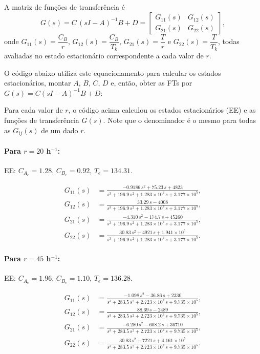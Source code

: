 \documentclass{article}
\begin{document}
A matriz de funções de transferência é
\[
G(s) = C\,(sI - A)^{-1} B + D =
\begin{bmatrix}
G_{11}(s) & G_{12}(s)\\
G_{21}(s) & G_{22}(s)
\end{bmatrix},
\]
onde $G_{11}(s) = \dfrac{C_B}{r}$, $G_{12}(s) = \dfrac{C_B}{T_k}$, $G_{21}(s) = \dfrac{T}{r}$ e $G_{22}(s) = \dfrac{T}{T_k}$, todas avaliadas no estado estacionário correspondente a cada valor de $r$.

\medskip

O código abaixo utiliza este equacionamento para calcular os estados estacionários, montar $A$, $B$, $C$, $D$ e, então, obter as FTs por $G(s) = C(sI-A)^{-1}B + D$:



Para cada valor de $r$, o código acima calculou os estados estacionários (EE) e as funções de transferência $G(s)$. Note que o denominador é o mesmo para todas as $G_{ij}(s)$ de um dado $r$.

\paragraph{Para $r = 20$ h$^{-1}$:}
EE: $C_{A_e} = 1.28$, $C_{B_e} = 0.92$, $T_e = 134.31$.

\begin{align*}
G_{11}(s) &= \frac{-0.9186\,s^2 + 75.23\,s + 4823}{s^3 + 196.9\,s^2 + 1.283\times 10^{4}\,s + 3.177\times 10^{5}}, \\
G_{12}(s) &= \frac{33.29\,s - 4008}{s^3 + 196.9\,s^2 + 1.283\times 10^{4}\,s + 3.177\times 10^{5}}, \\
G_{21}(s) &= \frac{-4.310\,s^2 - 174.7\,s + 45260}{s^3 + 196.9\,s^2 + 1.283\times 10^{4}\,s + 3.177\times 10^{5}}, \\
G_{22}(s) &= \frac{30.83\,s^2 + 4921\,s + 1.941\times 10^{5}}{s^3 + 196.9\,s^2 + 1.283\times 10^{4}\,s + 3.177\times 10^{5}}.
\end{align*}

\paragraph{Para $r = 45$ h$^{-1}$:}
EE: $C_{A_e} = 1.96$, $C_{B_e} = 1.10$, $T_e = 136.28$.

\begin{align*}
G_{11}(s) &= \frac{-1.098\,s^2 - 36.86\,s + 2330}{s^3 + 283.5\,s^2 + 2.723\times 10^{4}\,s + 9.735\times 10^{5}}, \\
G_{12}(s) &= \frac{88.69\,s - 2489}{s^3 + 283.5\,s^2 + 2.723\times 10^{4}\,s + 9.735\times 10^{5}}, \\
G_{21}(s) &= \frac{-6.280\,s^2 - 608.2\,s + 36710}{s^3 + 283.5\,s^2 + 2.723\times 10^{4}\,s + 9.735\times 10^{5}}, \\
G_{22}(s) &= \frac{30.83\,s^2 + 7221\,s + 4.161\times 10^{5}}{s^3 + 283.5\,s^2 + 2.723\times 10^{4}\,s + 9.735\times 10^{5}}.
\end{align*}
\end{document}
